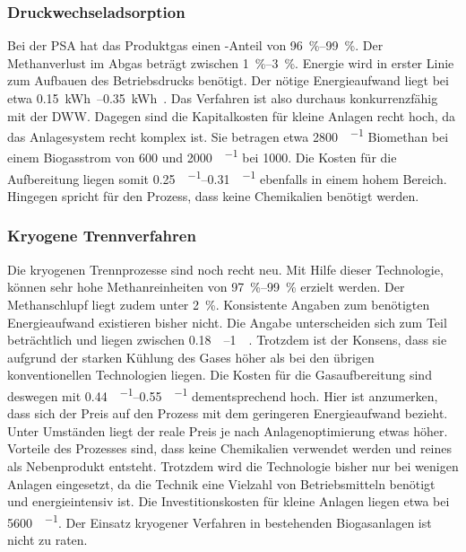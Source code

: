 \subsubsection{Druckwechseladsorption}
Bei der \gls{PSA} hat das Produktgas einen -Anteil von \SIrange{96}{99}{\percent}. Der Methanverlust im Abgas beträgt zwischen \SIrange{1}{3}{\percent}. Energie wird in erster Linie zum Aufbauen des Betriebsdrucks benötigt. Der nötige Energieaufwand liegt bei etwa \SIrange{0,15}{0,35}{\kWh\normvol}. Das Verfahren ist also durchaus konkurrenzfähig mit der \gls{DWW}. Dagegen sind die Kapitalkosten für kleine Anlagen recht hoch, da das Anlagesystem recht komplex ist. Sie betragen etwa \SI{2800}{\sieuro\per\normvolh} Biomethan bei einem Biogasstrom von \SI{600}{\normvolh} und \SI{2000}{\sieuro\per\normvolh} bei \SI{1000}{\normvolh}. Die Kosten für die Aufbereitung liegen somit \SIrange{0,25}{0,31}{\sieuro\per\normvol} ebenfalls in einem hohem Bereich. Hingegen spricht für den Prozess, dass keine Chemikalien benötigt werden. \parencite{AONC2019} \parencite{BHPT13} \parencite{dena2019} \parencite{DSW15} \parencite{KGKK2019} \parencite{Coll17}


\subsubsection{Kryogene Trennverfahren}
Die kryogenen Trennprozesse sind noch recht neu. Mit Hilfe dieser Technologie, können sehr hohe Methanreinheiten von \SIrange{97}{99}{\percent} erzielt werden. Der Methanschlupf liegt zudem unter \SI{2}{\percent}. Konsistente Angaben zum benötigten Energieaufwand existieren bisher nicht. Die Angabe unterscheiden sich zum Teil beträchtlich und liegen zwischen \SIrange{0,18}{1}{\kwh\normvol}. Trotzdem ist der Konsens, dass sie aufgrund der starken Kühlung des Gases höher als bei den übrigen konventionellen Technologien liegen. Die Kosten für die Gasaufbereitung sind deswegen mit \SIrange{0,44}{0,55}{\sieuro\per\normvol} dementsprechend hoch. Hier ist anzumerken, dass sich der Preis auf den Prozess mit dem geringeren Energieaufwand bezieht. Unter Umständen liegt der reale Preis je nach Anlagenoptimierung etwas höher. Vorteile des Prozesses sind, dass keine Chemikalien verwendet werden und reines  als Nebenprodukt entsteht. Trotzdem wird die Technologie bisher nur bei wenigen Anlagen eingesetzt, da die Technik eine Vielzahl von Betriebsmitteln benötigt und energieintensiv ist. Die Investitionskosten für kleine Anlagen liegen etwa bei \SI{5600}{\sieuro\per\normvolh}. Der Einsatz kryogener Verfahren in bestehenden Biogasanlagen ist nicht zu raten. \parencite{AONC2019} \parencite{Emp18} \parencite{KGKK2019}


